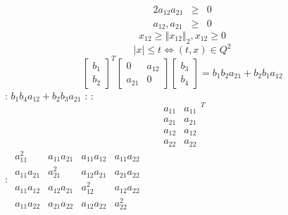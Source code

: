 \documentclass{article}
\begin{document}
$\allowbreak $%
\begin{eqnarray*}
2a_{12}a_{21} &\geq &0 \\
a_{12},a_{21} &\geq &0
\end{eqnarray*}%
\[
x_{12}\geq \left\Vert x_{12}\right\Vert _{2},x_{12}\geq 0
\]%
\[
\left\vert x\right\vert \leq t\iff \left( t,x\right) \in Q^{2}
\]%
\[
\left[ 
\begin{array}{c}
b_{1} \\ 
b_{2}%
\end{array}%
\right] ^{T}\left[ 
\begin{array}{cc}
0 & a_{12} \\ 
a_{21} & 0%
\end{array}%
\right] \left[ 
\begin{array}{c}
b_{3} \\ 
b_{4}%
\end{array}%
\right] =b_{1}b_{2}a_{21}+b_{2}b_{1}a_{12}
\]%
: $b_{1}b_{4}a_{12}+b_{2}b_{3}a_{21}$ : :%
\[
\begin{array}{c}
a_{11} \\ 
a_{21} \\ 
a_{12} \\ 
a_{22}%
\end{array}%
\begin{array}{c}
a_{11} \\ 
a_{21} \\ 
a_{12} \\ 
a_{22}%
\end{array}%
^{T}
\]
: $%
\begin{array}{cccc}
a_{11}^{2} & a_{11}a_{21} & a_{11}a_{12} & a_{11}a_{22} \\ 
a_{11}a_{21} & a_{21}^{2} & a_{12}a_{21} & a_{21}a_{22} \\ 
a_{11}a_{12} & a_{12}a_{21} & a_{12}^{2} & a_{12}a_{22} \\ 
a_{11}a_{22} & a_{21}a_{22} & a_{12}a_{22} & a_{22}^{2}%
\end{array}%
\allowbreak $
\end{document}
